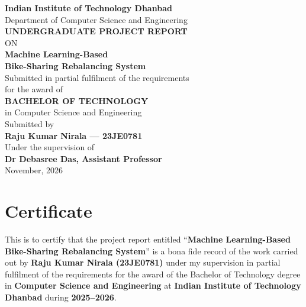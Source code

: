 \documentclass[12pt,a4paper]{report}
\begin{document}

\begin{titlepage}
\centering
\vspace*{0.5in}

{\Large \textbf{Indian Institute of Technology Dhanbad}}\\[6pt]
{\large Department of Computer Science and Engineering}\\[24pt]

{\Large \textbf{UNDERGRADUATE PROJECT REPORT}}\\[6pt]
{\large ON}\\[12pt]

{\LARGE \textbf{Machine Learning-Based\\[4pt]
Bike-Sharing Rebalancing System}}\\[24pt]

{\large Submitted in partial fulfilment of the requirements\\
for the award of}\\[6pt]
{\large \textbf{BACHELOR OF TECHNOLOGY}}\\[4pt]
{\large in Computer Science and Engineering}\\[24pt]

{\large Submitted by}\\[6pt]
{\large \textbf{Raju Kumar Nirala --- 23JE0781}}\\[24pt]

{\large Under the supervision of}\\[6pt]
{\large \textbf{Dr Debasree Das, Assistant Professor}}\\[24pt]

{\large November, 2026}\\[12pt]
\vfill
\end{titlepage}

\chapter*{Certificate}

\noindent This is to certify that the project report entitled
``\textbf{Machine Learning-Based Bike-Sharing Rebalancing System}''
is a bona fide record of the work carried out by
\textbf{Raju Kumar Nirala (23JE0781)} under my supervision in
partial fulfilment of the requirements for the award of the Bachelor
of Technology degree in \textbf{Computer Science and Engineering} at
\textbf{Indian Institute of Technology Dhanbad} during
\textbf{2025--2026}.
\end{document}
